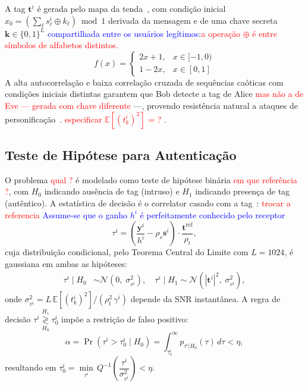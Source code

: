 \documentclass{sbrt}
\newcommand{\bblue}[1]{\textcolor{blue}{#1}}
\newcommand{\rred}[1]{\textcolor{red}{#1}}
\begin{document}
A tag $\mathbf{t}^i$ é gerada pelo mapa da tenda~\cite{ref_joao}, com condição inicial $x_0 = (\sum_\ell s^i_\ell \oplus k_\ell) \bmod 1$ derivada da mensagem e de uma chave secreta $\mathbf{k} \in \{0,1\}^L$ \bblue{compartilhada entre os usuários legítimos}:\rred{a operação $\oplus$ é entre símbolos de alfabetos distintos.}
\begin{equation}\label{eq:tentmap}
    f(x) = \begin{cases} 2x+1, & x \in [-1,0) \\ 1-2x, & x \in [0,1] \end{cases}
\end{equation}
A alta autocorrelação e baixa correlação cruzada de sequências caóticas com condições iniciais distintas garantem que Bob detecte a tag de Alice \rred{mas não a de Eve — gerada com chave diferente }—, provendo resistência natural a ataques de personificação~\cite{ref_joao}.
\rred{especificar $\mathbb{E}[(t_k^i)^2]$ = ? }.


\subsection{Teste de Hipótese para Autenticação}\label{sec:hip}

O problema \rred{qual ?} é modelado como teste de hipótese binária \rred{em que referência ?}, com $H_0$ indicando ausência de tag (intruso) e $H_1$ indicando presença de tag (autêntico). A estatística de decisão é o correlator casado com a tag~\cite{ref_joao}: \rred{trocar  a referencia} \bblue{Assume-se que o ganho $h^i$ é perfeitamente conhecido pelo receptor}
\begin{equation}\label{eq:tau}
    \tau^i = \left(\frac{\mathbf{y}^i}{h^i} - \rho_s \mathbf{s}^i\right) \cdot \frac{\mathbf{t}^{\mathrm{ref}}}{\rho_t},
\end{equation}
cuja distribuição condicional, pelo Teorema Central do Limite com $L = 1024$, é gaussiana em ambas as hipóteses:
\begin{align}
    \tau^i \mid H_0 &\sim \mathcal{N}\!\left(0,\; \sigma_{v^i}^2\right),\quad
    \tau^i \mid H_1 \sim \mathcal{N}\!\left(|\mathbf{t}^i|^2,\; \sigma_{v^i}^2\right), \label{eq:dists}
\end{align}
onde $\sigma_{v^i}^2 = L\,\mathbb{E}[(t^i_k)^2]/(\rho_t^2\,\gamma^i)$ depende da SNR instantânea.
 A regra de decisão $\tau^i \underset{H_0}{\overset{H_1}{\gtrless}} \tau^i_0$ impõe a restrição de falso positivo:
\begin{equation}\label{eq:alpha}
    \alpha = \Pr(\tau^i > \tau_0^i \mid H_0) = \int_{\tau_0^i}^{\infty} p_{\tau^i|H_0}(\tau)\,d\tau < \eta,
\end{equation}
resultando em $\tau^i_0 = \min\limits_{\tau^i}\,Q^{-1}\!\left(\dfrac{\tau^i}{\sigma^2_{v^i}}\right) < \eta$.
\end{document}
